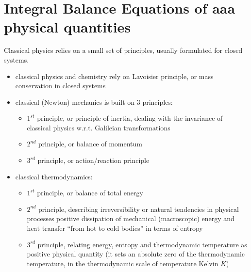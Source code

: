 \documentclass[letterpaper,10pt,english]{jupyterBook}
\begin{document}
\section{Integral Balance Equations of aaa physical quantities}
\label{\detokenize{ch/continuum/balance-primary-integral:integral-balance-equations-of-aaa-physical-quantities}}\label{\detokenize{ch/continuum/balance-primary-integral:continuum-governing-equations-primary-integral}}\label{\detokenize{ch/continuum/balance-primary-integral::doc}}
\sphinxAtStartPar
Classical physics relies on a small set of principles, usually formulated for closed systems.
\begin{itemize}
\item {} 
\sphinxAtStartPar
classical physics and chemistry rely on Lavoisier principle, or mass conservation in closed systems

\item {} 
\sphinxAtStartPar
classical (Newton) mechanics is built on 3 principles:
\begin{itemize}
\item {} 
\sphinxAtStartPar
\(1^{st}\) principle, or principle of inertia, dealing with the invariance of classical physics w.r.t. Galileian transformations

\item {} 
\sphinxAtStartPar
\(2^{nd}\) principle, or balance of momentum

\item {} 
\sphinxAtStartPar
\(3^{rd}\) principle, or action/reaction principle

\end{itemize}

\item {} 
\sphinxAtStartPar
classical thermodynamics:
\begin{itemize}
\item {} 
\sphinxAtStartPar
\(1^{st}\) principle, or balance of total energy

\item {} 
\sphinxAtStartPar
\(2^{nd}\) principle, describing irreversibility or natural tendencies in physical processes \sphinxhyphen{} positive dissipation of mechanical (macroscopic) energy and heat transfer “from hot to cold bodies” \sphinxhyphen{} in terms of entropy

\item {} 
\sphinxAtStartPar
\(3^{rd}\) principle, relating energy, entropy and thermodynamic temperature as positive physical quantity (it sets an absolute zero of the thermodynamic temperature, in the thermodynamic scale of temperature \sphinxhyphen{} Kelvin \(K\))


\end{itemize}
\end{itemize}
\end{document}
